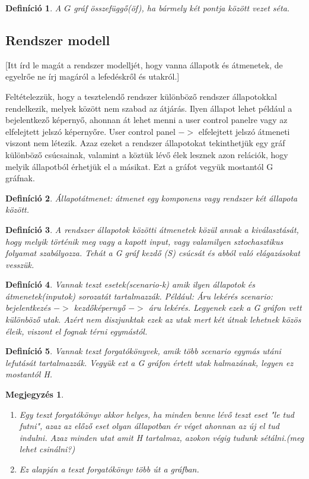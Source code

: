 \documentclass[12pt]{article}
\newtheorem{defin}{Definíció}[section]
\newtheorem{megj}{Megjegyzés}[section]
\begin{document}
\begin{defin}
A $G$ gráf összefüggő(öf), ha bármely két pontja között vezet séta. ~\cite{szam:Fleiner}
\end{defin}

\subsection{Rendszer modell}
[Itt írd le magát a rendszer modelljét, hogy vanna állapotk és átmenetek, de egyelrőe ne írj magáról a lefedéskről és utakról.]

Feltételezzük, hogy a tesztelendő rendszer különböző rendszer állapotokkal rendelkezik, melyek között nem szabad az átjárás. Ilyen állapot lehet például a bejelentkező képernyő, ahonnan át lehet menni a user control panelre vagy az elfelejtett jelszó képernyőre. User control panel $->$ elfelejtett jelszó átmeneti viszont nem létezik. Azaz ezeket a rendszer állapotokat tekinthetjük egy gráf különböző csúcsainak, valamint a köztük lévő élek lesznek azon relációk, hogy melyik állapotból érhetjük el a másikat. Ezt a gráfot vegyük mostantól G gráfnak.


\begin{defin}
Állapotátmenet: átmenet egy komponens vagy rendszer két állapota között. ~\cite{htb:masterfield}
\end{defin}

\begin{defin}
A rendszer állapotok közötti átmenetek közül annak a kiválasztását, hogy melyik történik meg vagy a kapott input, vagy valamilyen sztochasztikus folyamat szabályozza. Tehát a G gráf kezdő (S) csúcsát és abból való elágazásokat vesszük.
\end{defin}

\begin{defin}
Vannak teszt esetek(scenario-k) amik ilyen állapotok és átmenetek(inputok) sorozatát tartalmazzák. Például: Áru lekérés scenario:  bejelentkezés $->$ kezdőképernyő $->$ áru lekérés. Legyenek ezek a G gráfon vett különböző utak. Azért nem diszjunktak ezek az utak mert két útnak lehetnek közös éleik, viszont el fognak térni egymástól.
\end{defin}

\begin{defin}
Vannak teszt forgatókönyvek, amik több scenario egymás utáni lefutását tartalmazzák. Vegyük ezt a G gráfon értett utak halmazának, legyen ez mostantól H.
\end{defin}

\begin{megj}
\begin{enumerate}
\item Egy teszt forgatókönyv akkor helyes, ha minden benne lévő teszt eset "le tud futni", azaz az előző eset olyan állapotban ér véget ahonnan az új el tud indulni. Azaz minden utat amit H tartalmaz, azokon végig tudunk sétálni.(meg lehet csinálni?)
\item Ez alapján a teszt forgatókönyv több út a gráfban.
\end{enumerate}
\end{megj}
\end{document}
